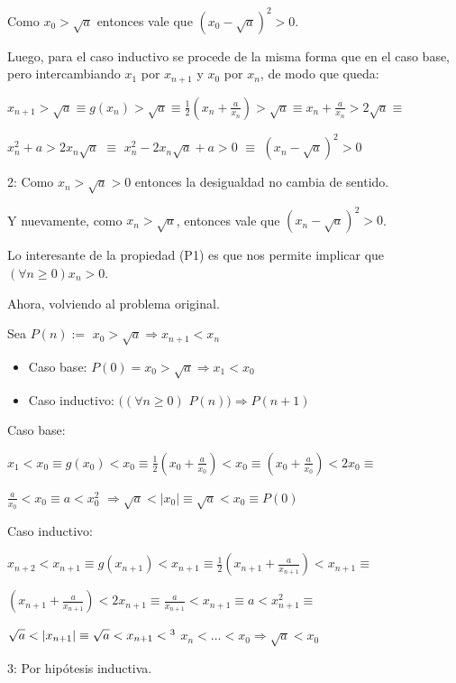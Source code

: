 Como $x_0 > \sqrt{a}$ entonces vale que $\left(x_{0} - \sqrt{a}\right)^2 > 0$.

Luego, para el caso inductivo se procede de la misma forma que en el caso base, pero intercambiando $x_1$ por $x_{n+1}$ y $x_0$ por $x_n$, de modo que queda:

\hspace{4cm}$\displaystyle  x_{n+1} > \sqrt{a} \equiv g(x_n) > \sqrt{a} \equiv \frac{1}{2}\left(x_n+ \frac{a}{x_n}\right) > \sqrt{a} \equiv x_n+ \frac{a}{x_n} > 2\sqrt{a}\equiv$


\hspace{4cm}$\displaystyle  x_{n}^2+ a > 2x_{n}\sqrt{a}$ \footnotemark[2] $\equiv$	$x_{n}^2 - 2x_{n}\sqrt{a} + a > 0$ $\equiv$ $\left(x_{n} - \sqrt{a}\right)^2 > 0$


2: Como $x_n > \sqrt{a} > 0$ entonces la desigualdad no cambia de sentido.

Y nuevamente, como $x_n > \sqrt{a}$, entonces vale que $\left(x_{n} - \sqrt{a}\right)^2 > 0$.

Lo interesante de la propiedad (P1) es que nos permite implicar que $(\forall n \geq 0) x_n > 0$.

Ahora, volviendo al problema original.

Sea $P(n):=$ $x_0 > \sqrt{a} \Rightarrow x_{n+1} < x_{n}$
\begin{itemize}
	\item Caso base: $P(0) = x_0 > \sqrt{a} \Rightarrow x_1 < x_0$
	\item Caso inductivo: $((\forall n\geq 0)$ $P(n)) \Rightarrow P(n+1)$
\end{itemize}

Caso base:


\hspace{4cm}$\displaystyle x_1 < x_0 \equiv g(x_0) < x_0 \equiv \frac{1}{2}\left(x_0 + \frac{a}{x_0}\right) < x_0 \equiv \left(x_0 + \frac{a}{x_0}\right) < 2x_0 \equiv$


\hspace{4.5cm}$\displaystyle \frac{a}{x_0} < x_0 \equiv a < x_{0}^2$ $\Rightarrow \sqrt{a} < |x_0| \equiv \sqrt{a} < x_0 \equiv P(0)$

Caso inductivo:
 
\hspace{4cm}$\displaystyle  x_{n+2} < x_{n+1} \equiv g(x_{n+1}) < x_{n+1} \equiv \frac{1}{2}\left(x_{n+1} + \frac{a}{x_{n+1}}\right) < x_{n+1} \equiv $


\hspace{4cm}$\displaystyle  \left(x_{n+1} + \frac{a}{x_{n+1}}\right) < 2x_{n+1} \equiv \frac{a}{x_{n+1}} < x_{n+1} \equiv a < x_{n+1}^2 \equiv $


\hspace{4cm}$\displaystyle  \sqrt{a} < |x_{n+1}| \equiv \sqrt{a} < x_{n+1} <\footnotemark[3]$  $x_n < \ldots < x_0 \Rightarrow \sqrt{a} < x_0$


3: Por hip\'otesis inductiva.